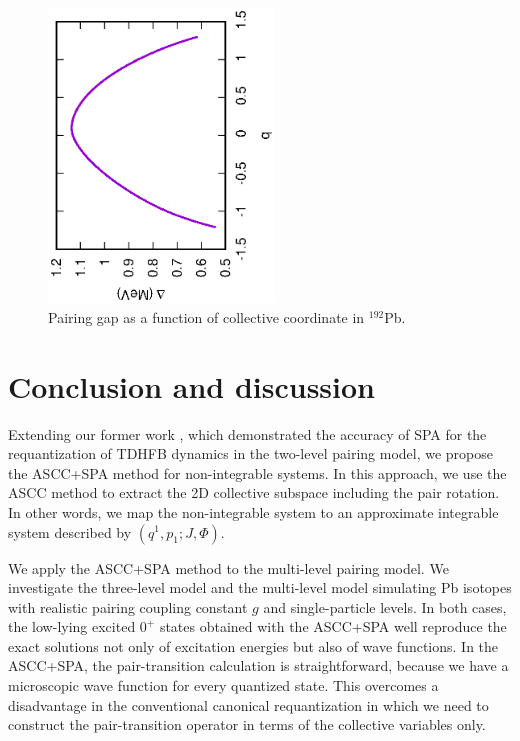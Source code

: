 \documentclass[%
superscriptaddress,
showpacs,
nofootinbib,
amsmath,amssymb,
aps,
prc,
twocolumn,
floatfix ]%
{revtex4-1}
\begin{document}
\begin{figure}[htbp]
 \begin{center}
  \includegraphics[width=60mm,angle=-90]{192Pbgap.eps}
 \end{center}
	\caption{Pairing gap as a function of collective coordinate in ${}^{192}$Pb. 
}
 \label{192Pb_gap}
\end{figure}


\section{Conclusion and discussion}
\label{sec5}

Extending our former work \cite{NN18},
which demonstrated the accuracy of SPA for the requantization
of TDHFB dynamics in the two-level pairing model, 
we propose the ASCC+SPA method for non-integrable systems.
In this approach, we use the ASCC method to extract the 2D
collective subspace including the pair rotation.
In other words, we map the non-integrable system to an approximate
integrable system described by $(q^1,p_1;J,\Phi)$.


We apply the ASCC+SPA method to the multi-level pairing model.
We investigate the three-level model and 
the multi-level model simulating Pb isotopes
with realistic pairing coupling constant $g$ and single-particle levels.
In both cases, the low-lying excited $0^+$ states obtained with
the ASCC+SPA well reproduce the exact solutions
not only of excitation energies but also of wave functions.
In the ASCC+SPA, the pair-transition calculation is straightforward,
because we have a microscopic wave function for every quantized state.
This overcomes a disadvantage in the conventional canonical requantization
in which we need to construct the pair-transition operator
in terms of the collective variables only.
\end{document}
